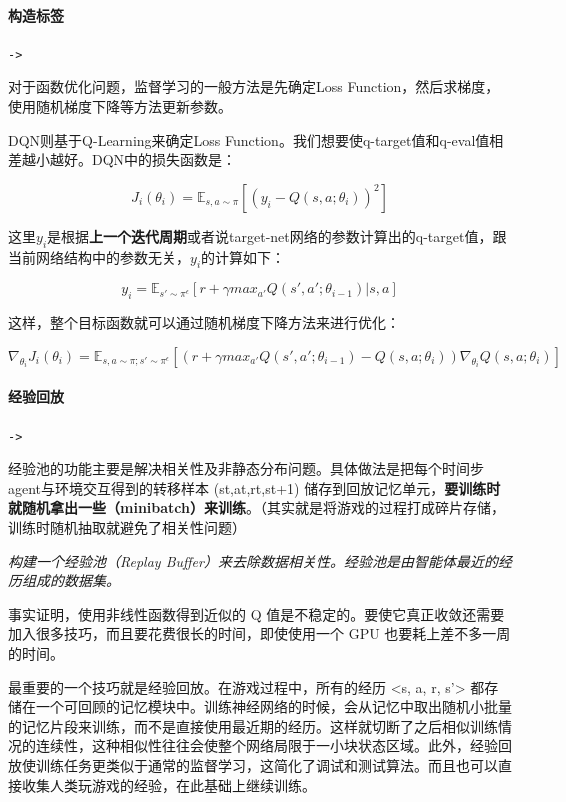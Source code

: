 \documentclass[UTF8,a4paper,12pt]{ctexbook}
\begin{document}
			\paragraph{构造标签}
				\verb|->|
				
				对于函数优化问题，监督学习的一般方法是先确定Loss Function，然后求梯度，使用随机梯度下降等方法更新参数。
				
				DQN则基于Q-Learning来确定Loss Function。我们想要使q-target值和q-eval值相差越小越好。DQN中的损失函数是：
				
				$$
				J_i(\theta_i) = \mathbb{E}_{s,a \sim \pi}\left[(y_i - Q(s,a;\theta_i))^2 \right]
				$$
				
				这里$y_i$是根据\textbf{上一个迭代周期}或者说target-net网络的参数计算出的q-target值，跟当前网络结构中的参数无关，$y_i$的计算如下：
				
				$$
				y_i = \mathbb{E}_{s' \sim \pi^\epsilon}\left[r + \gamma max_{a'} Q(s', a'; \theta_{i-1})|s,a \right]
				$$
				
				这样，整个目标函数就可以通过随机梯度下降方法来进行优化：
				
				$$
					\nabla_{\theta_i} J_i(\theta_i) = \mathbb{E}_{s,a \sim \pi; s' \sim \pi^\epsilon}\left[ \left(r + \gamma max_{a'} Q(s', a'; \theta_{i-1}) - Q(s,a; \theta_i)\right) \nabla_{\theta_i}Q(s,a;\theta_i) \right]
				$$
				
			\paragraph{经验回放}
				\verb|->|
			
				经验池的功能主要是解决相关性及非静态分布问题。具体做法是把每个时间步agent与环境交互得到的转移样本 (st,at,rt,st+1) 储存到回放记忆单元，\textbf{要训练时就随机拿出一些（minibatch）来训练}。（其实就是将游戏的过程打成碎片存储，训练时随机抽取就避免了相关性问题）
				
				\textit{构建一个经验池（Replay Buffer）来去除数据相关性。经验池是由智能体最近的经历组成的数据集。}
			
				事实证明，使用非线性函数得到近似的 Q 值是不稳定的。要使它真正收敛还需要加入很多技巧，而且要花费很长的时间，即使使用一个 GPU 也要耗上差不多一周的时间。
				
				最重要的一个技巧就是经验回放。在游戏过程中，所有的经历 <s, a, r, s'> 都存储在一个可回顾的记忆模块中。训练神经网络的时候，会从记忆中取出随机小批量的记忆片段来训练，而不是直接使用最近期的经历。这样就切断了之后相似训练情况的连续性，这种相似性往往会使整个网络局限于一小块状态区域。此外，经验回放使训练任务更类似于通常的监督学习，这简化了调试和测试算法。而且也可以直接收集人类玩游戏的经验，在此基础上继续训练。
				
\end{document}
